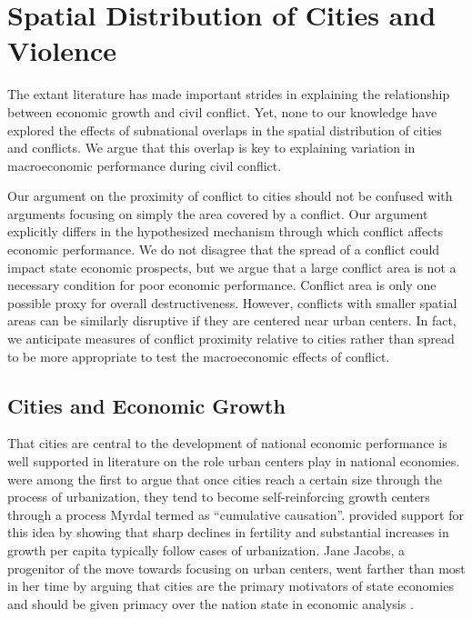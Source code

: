 
\section{Spatial Distribution of Cities and Violence}
\label{theory}

The extant literature has made important strides in explaining the relationship between economic growth and civil conflict. Yet, none to our knowledge have explored the effects of subnational overlaps in the spatial distribution of cities and conflicts. We argue that this overlap is key to explaining variation in macroeconomic performance during civil conflict. 

Our argument on the proximity of conflict to cities should not be confused with arguments focusing on simply the area covered by a conflict. Our argument explicitly differs in the hypothesized mechanism through which conflict affects economic performance. We do not disagree that the spread of a conflict could impact state economic prospects, but we argue that a large conflict area is not a necessary condition for poor economic performance. Conflict area is only one possible proxy for overall destructiveness. However, conflicts with smaller spatial areas can be similarly disruptive if they are centered near urban centers. In fact, we anticipate measures of conflict proximity relative to cities rather than spread to be more appropriate to test the macroeconomic effects of conflict.

\subsection{Cities and Economic Growth}

That cities are central to the development of national economic performance is well supported in literature on the role urban centers play in national economies. \citet{myrdal:sitohang:1957} were among the first to argue that once cities reach a certain size through the process of urbanization, they tend to become self-reinforcing growth centers through a process Myrdal termed as ``cumulative causation''. \citet{chenery:syrquin:1975} provided support for this idea by showing that sharp declines in fertility and substantial increases in growth per capita typically follow cases of urbanization. Jane Jacobs, a progenitor of the move towards focusing on urban centers, went farther than most in her time by arguing that cities are the primary motivators of state economies and should be given primacy over the nation state in economic analysis \citep{jacobs:1969,jacobs:1984}. 


